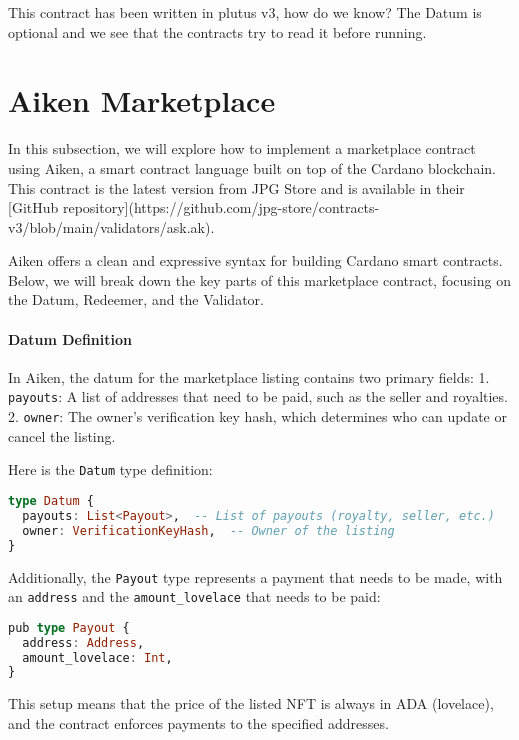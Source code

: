 This contract has been written in plutus v3, how do we know?
The Datum is optional and we see that the contracts try to read it before running.

\section{Aiken Marketplace}

In this subsection, we will explore how to implement a marketplace contract using Aiken, a smart contract language built on top of the Cardano blockchain. This contract is the latest version from JPG Store and is available in their [GitHub repository](https://github.com/jpg-store/contracts-v3/blob/main/validators/ask.ak).

Aiken offers a clean and expressive syntax for building Cardano smart contracts. Below, we will break down the key parts of this marketplace contract, focusing on the Datum, Redeemer, and the Validator.

\paragraph{Datum Definition}
In Aiken, the datum for the marketplace listing contains two primary fields:
1. \texttt{payouts}: A list of addresses that need to be paid, such as the seller and royalties.
2. \texttt{owner}: The owner’s verification key hash, which determines who can update or cancel the listing.

Here is the \texttt{Datum} type definition:

\begin{lstlisting}[language=haskell, caption=Datum Definition in Aiken]
type Datum {
  payouts: List<Payout>,  -- List of payouts (royalty, seller, etc.)
  owner: VerificationKeyHash,  -- Owner of the listing
}
\end{lstlisting}

Additionally, the \texttt{Payout} type represents a payment that needs to be made, with an \texttt{address} and the \texttt{amount\_lovelace} that needs to be paid:

\begin{lstlisting}[language=haskell, caption=Payout Definition in Aiken]
pub type Payout {
  address: Address,
  amount_lovelace: Int,
}
\end{lstlisting}

This setup means that the price of the listed NFT is always in ADA (lovelace), and the contract enforces payments to the specified addresses.

